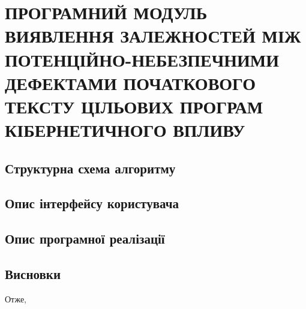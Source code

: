 \chapter{ПРОГРАМНИЙ МОДУЛЬ ВИЯВЛЕННЯ ЗАЛЕЖНОСТЕЙ МІЖ ПОТЕНЦІЙНО-НЕБЕЗПЕЧНИМИ ДЕФЕКТАМИ ПОЧАТКОВОГО ТЕКСТУ ЦІЛЬОВИХ ПРОГРАМ КІБЕРНЕТИЧНОГО ВПЛИВУ}
\label{3section::doc}\label{3section:id1}

\section{Структурна схема алгоритму}
\label{3section:id2}

\section{Опис інтерфейсу користувача}
\label{3section:id3}

\section{Опис програмної реалізації}
\label{3section:id4}

\section*{Висновки}
Отже,
